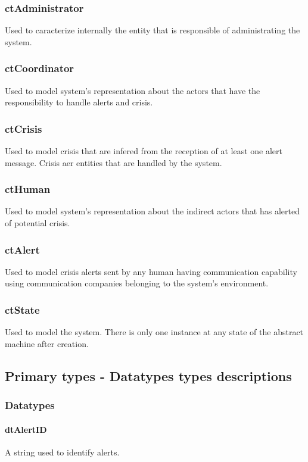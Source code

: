 \subsubsection{ctAdministrator}
Used to caracterize internally the entity that is responsible of administrating
the \mysystemname system.

\subsubsection{ctCoordinator}
Used to model system’s representation about the actors that have
the responsibility to handle alerts and crisis.

\subsubsection{ctCrisis} 
Used to model crisis that are infered from the reception of at least
one alert message. Crisis aer entities that are handled by the \mysystemname system.

\subsubsection{ctHuman} 
Used to model system’s representation about the indirect actors that has
alerted of potential crisis.

\subsubsection{ctAlert}
Used to model crisis alerts sent by any human having communication capability
using communication companies belonging to the system’s environment.

\subsubsection{ctState} 
Used to model the system. There is only one instance at any state of the
abstract machine after creation.

\subsection{Primary types - Datatypes types descriptions}

\subsubsection{Datatypes}

\paragraph*{\textbf{dtAlertID}}
A string used to identify alerts.

